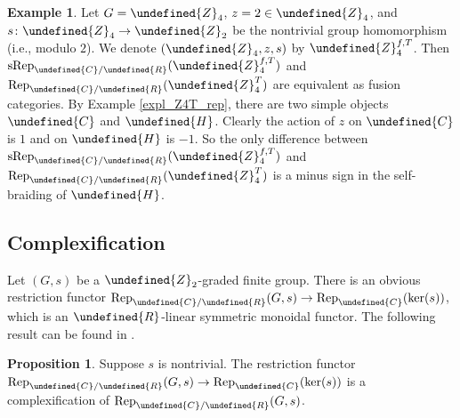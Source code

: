 \documentclass[10pt]{article}
\let\mathbb\undefined
\theoremstyle{definition}
\newtheorem{prop}[thm]{Proposition}
\newtheorem{expl}[thm]{Example}
\numberwithin{equation}{section}
\numberwithin{thm}{section}
\newcommand{\Cb}{\mathbb{C}}
\newcommand{\Hb}{\mathbb{H}}
\newcommand{\Rb}{\mathbb{R}}
\newcommand{\Zb}{\mathbb{Z}}
\newcommand{\rep}{\mathrm{Rep}}
\newcommand{\srep}{\mathrm{sRep}}
\begin{document}
\begin{expl}
Let $G = \Zb_4$, $z = 2 \in \Zb_4$, and $s \colon \Zb_4 \to \Zb_2$ be the nontrivial group homomorphism (i.e., modulo $2$). We denote $(\Zb_4,z,s)$ by $\Zb_4^{f,T}$. Then $\srep_{\Cb/\Rb}(\Zb_4^{f,T})$ and $\rep_{\Cb/\Rb}(\Zb_4^T)$ are equivalent as fusion categories. By Example \ref{expl_Z4T_rep}, there are two simple objects $\Cb$ and $\Hb$. Clearly the action of $z$ on $\Cb$ is $1$ and on $\Hb$ is $-1$. So the only difference between $\srep_{\Cb/\Rb}(\Zb_4^{f,T})$ and $\rep_{\Cb/\Rb}(\Zb_4^T)$ is a minus sign in the self-braiding of $\Hb$.
\end{expl}

\subsection{Complexification}

Let $(G,s)$ be a $\Zb_2$-graded finite group. There is an obvious restriction functor $\rep_{\Cb/\Rb}(G,s) \to \rep_\Cb(\ker(s))$, which is an $\Rb$-linear symmetric monoidal functor. The following result can be found in \cite[Proposition* 6.11]{KZ24}.

\begin{prop} \label{prop_complexification_rep}
Suppose $s$ is nontrivial. The restriction functor $\rep_{\Cb/\Rb}(G,s) \to \rep_\Cb(\ker(s))$ is a complexification of $\rep_{\Cb/\Rb}(G,s)$.
\end{prop}
\end{document}
